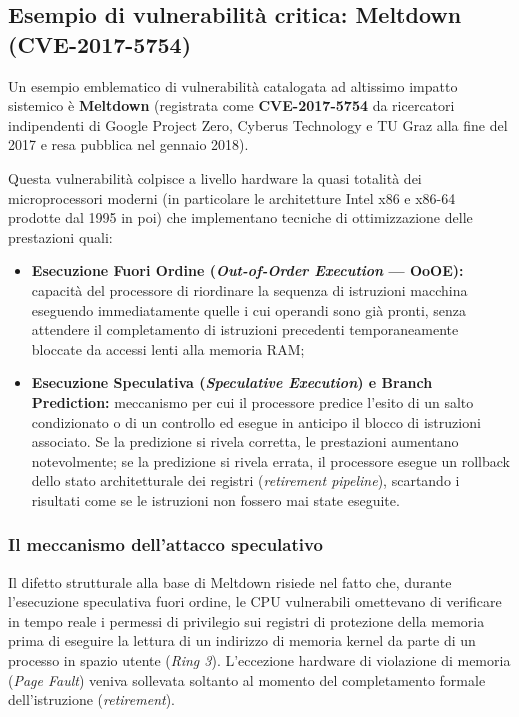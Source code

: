 \documentclass[../../main.tex]{subfiles}
\begin{document}
\subsection{Esempio di vulnerabilità critica: Meltdown (CVE-2017-5754)}
\label{subsec:meltdown}

Un esempio emblematico di vulnerabilità catalogata ad altissimo impatto sistemico è \textbf{Meltdown} (registrata come \textbf{CVE-2017-5754} da ricercatori indipendenti di Google Project Zero, Cyberus Technology e TU Graz alla fine del 2017 e resa pubblica nel gennaio 2018).

Questa vulnerabilità colpisce a livello hardware la quasi totalità dei microprocessori moderni (in particolare le architetture Intel x86 e x86-64 prodotte dal 1995 in poi) che implementano tecniche di ottimizzazione delle prestazioni quali:
\begin{itemize}
    \item \textbf{Esecuzione Fuori Ordine (\textit{Out-of-Order Execution} --- OoOE):} capacità del processore di riordinare la sequenza di istruzioni macchina eseguendo immediatamente quelle i cui operandi sono già pronti, senza attendere il completamento di istruzioni precedenti temporaneamente bloccate da accessi lenti alla memoria RAM;
    \item \textbf{Esecuzione Speculativa (\textit{Speculative Execution}) e Branch Prediction:} meccanismo per cui il processore predice l'esito di un salto condizionato o di un controllo ed esegue in anticipo il blocco di istruzioni associato. Se la predizione si rivela corretta, le prestazioni aumentano notevolmente; se la predizione si rivela errata, il processore esegue un rollback dello stato architetturale dei registri (\textit{retirement pipeline}), scartando i risultati come se le istruzioni non fossero mai state eseguite.
\end{itemize}

\subsubsection{Il meccanismo dell'attacco speculativo}
Il difetto strutturale alla base di Meltdown risiede nel fatto che, durante l'esecuzione speculativa fuori ordine, le CPU vulnerabili omettevano di verificare in tempo reale i permessi di privilegio sui registri di protezione della memoria prima di eseguire la lettura di un indirizzo di memoria kernel da parte di un processo in spazio utente (\textit{Ring 3}). L'eccezione hardware di violazione di memoria (\textit{Page Fault}) veniva sollevata soltanto al momento del completamento formale dell'istruzione (\textit{retirement}).
\end{document}
